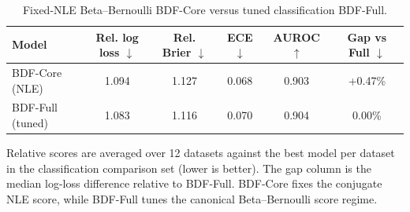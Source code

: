 \begin{table}[htbp]
\centering
\caption{Fixed-NLE Beta--Bernoulli BDF-Core versus tuned classification BDF-Full.}
\label{tab:bdf-core-vs-full-classification}
\begin{tabular}{lccccc}
\toprule
Model & Rel. log loss $\downarrow$ & Rel. Brier $\downarrow$ & ECE $\downarrow$ & AUROC $\uparrow$ & Gap vs Full $\downarrow$ \\
\midrule
BDF-Core (NLE) & 1.094 & 1.127 & 0.068 & 0.903 & +0.47\% \\
BDF-Full (tuned) & 1.083 & 1.116 & 0.070 & 0.904 & 0.00\% \\
\bottomrule
\end{tabular}
\par\smallskip\footnotesize{Relative scores are averaged over 12 datasets against the best model per dataset in the classification comparison set (lower is better). The gap column is the median log-loss difference relative to BDF-Full. BDF-Core fixes the conjugate NLE score, while BDF-Full tunes the canonical Beta--Bernoulli score regime.}
\end{table}
